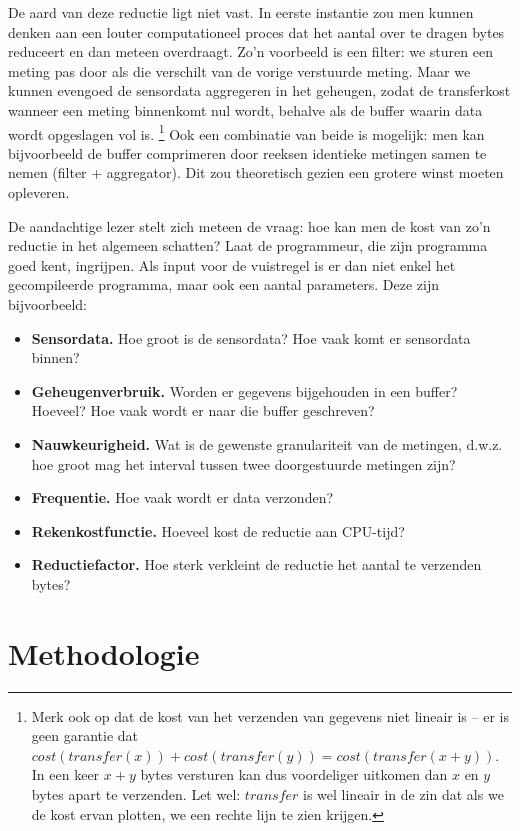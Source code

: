\documentclass[11pt]{article}
\begin{document}
De aard van deze reductie ligt niet vast. In eerste instantie zou men kunnen
denken aan een louter computationeel proces dat het aantal over te dragen bytes
reduceert en dan meteen overdraagt. Zo'n voorbeeld is een filter: we sturen een
meting pas door als die verschilt van de vorige verstuurde meting. Maar we
kunnen evengoed de sensordata aggregeren in het geheugen, zodat de transferkost
wanneer een meting binnenkomt nul wordt, behalve als de buffer waarin data wordt
opgeslagen vol is. \footnote{Merk ook op dat de kost van het verzenden van gegevens
niet lineair is -- er is geen garantie dat $cost(transfer(x)) +
cost(transfer(y)) = cost(transfer(x + y))$. In een keer $x + y$ bytes versturen
kan dus voordeliger uitkomen dan $x$ en $y$ bytes apart te verzenden. Let wel: $transfer$ is wel lineair in de zin dat als we de kost ervan plotten, we een rechte lijn te zien krijgen. } 
Ook een combinatie van beide is mogelijk: men kan bijvoorbeeld de buffer
comprimeren door reeksen identieke metingen samen te nemen (filter +
aggregator). Dit zou theoretisch gezien een grotere winst moeten opleveren.

De aandachtige lezer stelt zich meteen de vraag: hoe kan men de kost van zo'n
reductie in het algemeen schatten? Laat de programmeur, die zijn programma goed
kent, ingrijpen. Als input voor de vuistregel is er dan niet enkel het
gecompileerde programma, maar ook een aantal parameters. Deze zijn bijvoorbeeld:

\begin{itemize}
\item \textbf{Sensordata.} Hoe groot is de sensordata? Hoe vaak komt er sensordata binnen?
\item \textbf{Geheugenverbruik.} Worden er gegevens bijgehouden in een buffer? Hoeveel? Hoe vaak wordt er naar die buffer geschreven?
\item \textbf{Nauwkeurigheid.} Wat is de gewenste granulariteit van de metingen, d.w.z. hoe groot mag het interval tussen twee doorgestuurde metingen zijn?
\item \textbf{Frequentie.} Hoe vaak wordt er data verzonden?
\item \textbf{Rekenkostfunctie.} Hoeveel kost de reductie aan CPU-tijd?
\item \textbf{Reductiefactor.} Hoe sterk verkleint de reductie het aantal te verzenden bytes?
\end{itemize}

\section{Methodologie}
\end{document}
